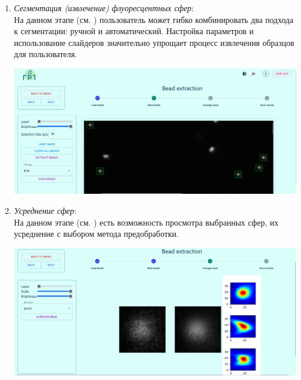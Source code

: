 \begin{enumerate}[]
	\item \textit{Сегментация (извлечение) флуоресцентных сфер}:\\
	На данном этапе (см. ) пользователь может гибко комбинировать два подхода к сегментации: ручной и автоматический. Настройка параметров и использование слайдеров значительно упрощает процесс извлечения образцов для пользователя.\\
	\begin{minipage}{\textwidth}
		\centering
		\vspace{\mfloatsep} %
		\includegraphics[keepaspectratio=true,scale=0.25] {my_folder/images/online_service/steper_extractor.png}
		\label{fig:bead-stepper}  
		\vspace{\mfloatsep} %
	\end{minipage}
\item \textit{Усреднение сфер}:\\
На данном этапе (см. ) есть возможность просмотра выбранных сфер, их усреднение с выбором метода предобработки.\\
\begin{minipage}{\textwidth}
	\centering
	\vspace{\mfloatsep} %
	\includegraphics[keepaspectratio=true,scale=0.25] {my_folder/images/online_service/averaging_bead.png}

\end{minipage}
\end{enumerate}
